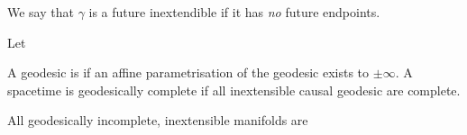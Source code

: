 \documentclass{article}
\begin{document}
We say that $\gamma$ is a future inextendible if it has \emph{no} future endpoints. 
\begin{example}
Let 
\end{example}

\begin{definition}
A geodesic is  if an affine parametrisation of the geodesic exists to $\pm\infty$. A spacetime is geodesically complete if all inextensible causal geodesic are complete. 
\end{definition}

\begin{theorem}
All geodesically incomplete, inextensible manifolds are 
\end{theorem}
\end{document}
